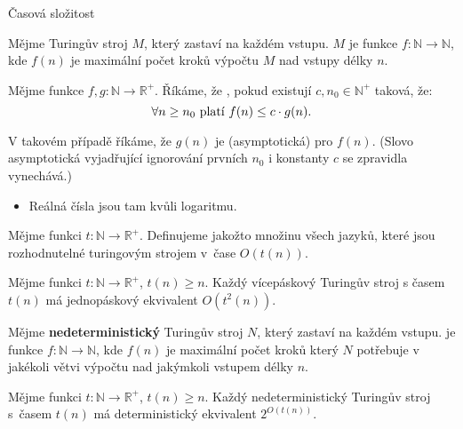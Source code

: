 \begin{frame}{Časová složitost}
    \begin{definition}
    Mějme Turingův stroj $M$, který zastaví na každém vstupu.
     $M$ je funkce $f:\mathbb{N}\to \mathbb{N}$, kde $f(n)$ je maximální počet kroků výpočtu $M$ nad vstupy délky $n$.
    \end{definition}
    \begin{definition}
    Mějme funkce $f,g: \mathbb{N}\to \mathbb{R}^+$. Říkáme, že , pokud existují $c,n_0\in \mathbb{N}^+$ taková, že:
    $$\forall n\geq n_0 \hbox{ platí  } f(n)\leq c\cdot g(n)\hbox{.}
    $$
    
    V takovém případě říkáme, že $g(n)$ je (asymptotická)  pro $f(n)$. (Slovo asymptotická vyjadřující ignorování prvních $n_0$ i konstanty $c$ se zpravidla vynechává.)
    \end{definition}
    \begin{itemize}
        \item[] Reálná čísla jsou tam kvůli logaritmu.
    \end{itemize}
    \end{frame}
    
    
    
    \newcommand{\T}{TIME}
    \begin{frame}%
    \begin{definition}
    Mějme funkci $t: \mathbb{N}\to \mathbb{R}^+$. Definujeme \pojem{třídu časové složitosti $\T(t(n))$} jakožto množinu všech jazyků, které jsou rozhodnutelné turingovým strojem v~čase $O(t(n))$.
    
    \end{definition}
    
    \begin{lemma}
    Mějme funkci $t: \mathbb{N}\to \mathbb{R}^+$, $t(n)\geq n$. Každý vícepáskový Turingův stroj s časem $t(n)$ má jednopáskový ekvivalent $O(t^2(n))$.
    \end{lemma}
    \begin{definition}
    Mějme {\bf nedeterministický} Turingův stroj $N$, který zastaví na každém vstupu.
      je funkce $f: \mathbb{N}\to \mathbb{N}$, kde $f(n)$ je maximální počet kroků který $N$ potřebuje v jakékoli větvi výpočtu nad jakýmkoli vstupem délky $n$.
    
    \end{definition}
    
    \begin{lemma}
    Mějme funkci $t: \mathbb{N}\to \mathbb{R}^+$, $t(n)\geq n$. Každý nedeterministický Turingův stroj s~časem $t(n)$ má deterministický ekvivalent $2^{O(t(n))}$.
    \end{lemma}
    
    \end{frame}
    
